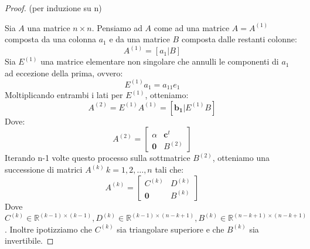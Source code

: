 \begin{proof}{(per induzione su n)}

    Sia $A$ una matrice $n \times n$.
    Pensiamo ad $A$ come ad una matrice $A = A^{(1)}$ composta da una colonna $a_1$ e da una matrice $B$ composta dalle restanti colonne:
    \[A^{(1)} = [a_1 | B]\]
    Sia $E^{(1)}$ una matrice elementare non singolare che annulli le componenti di $a_1$ ad eccezione della prima, ovvero:
    \[E^{(1)} a_1 = a_{11} e_1\]
    Moltiplicando entrambi i lati per $E^{(1)}$, otteniamo:
    \[A^{(2)} = E^{(1)} A^{(1)} = [\mathbf{b_1}|E^{(1)} B]\]
    Dove:
    \[
    A^{(2)} = \begin{bmatrix}
    \alpha & \textbf{c}^t \\
    \textbf{0} & B^{(2)}
    \end{bmatrix}
    \]
    Iterando n-1 volte questo processo sulla sottmatrice $B^{(2)}$, otteniamo una successione
    di matrici $A^{(k)} \, k = 1, 2, \ldots, n$ tali che:
    \[A^{(k)} = \begin{bmatrix}
    C^{(k)} & D^{(k)} \\
    \mathbf{0} & B^{(k)}
    \end{bmatrix}\]
    Dove $C^{(k)} \in \mathbb{R}^{(k-1) \times (k-1)}, D^{(k)} \in \mathbb{R}^{(k-1) \times (n-k+1)}, B^{(k)} \in \mathbb{R}^{(n-k+1) \times (n-k+1)}$.
    Inoltre ipotizziamo che $C^{(k)}$ sia triangolare superiore e che $B^{(k)}$ sia invertibile.
    

\end{proof}
